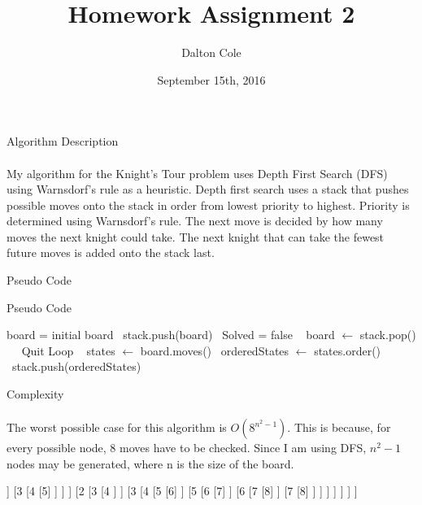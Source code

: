 \documentclass{article}
\title{Homework Assignment 2}
\author{Dalton Cole}
\date{September 15th, 2016}
\begin{document}
\maketitle

\pagebreak

\begin{center}
Algorithm Description
\end{center}

\paragraph{}
My algorithm for the Knight's Tour problem uses Depth First Search (DFS) using Warnsdorf's rule as a heuristic. Depth first search
uses a stack that pushes possible moves onto the stack in order from lowest priority to highest. Priority is determined using
Warnsdorf's rule. The next move is decided by how many moves the next knight could take. The next knight that can take the fewest
future moves is added onto the stack last.

\begin{center}
Pseudo Code
\end{center}

\begin{algorithm}
\caption{Pseudo Code}\label{euclid}
\begin{algorithmic}[1]
\State board = initial board \
\State stack.push(board) \
\State Solved = false \
	\State board $\gets$ stack.pop() \
	 \
		\State Quit Loop \
	\EndIf
	\State states $\gets$ board.moves() \
	\State orderedStates $\gets$ states.order() \
	\State stack.push(orderedStates) \
\EndWhile
\EndProcedure
\end{algorithmic}
\end{algorithm}

\begin{center}
Complexity
\end{center}

\paragraph{}
The worst possible case for this algorithm is $O(8^{n^2-1})$. This is because, for every possible node, 8 moves have to be checked. Since I am using DFS, $n^2-1$ nodes may be generated, where n is the size of the board.


\begin{forest}
  [1
    [2
     [3
       [4]
     ]
     [3
       [4
         [5]
       ]
     ]
    ]
    [2
      [3
        [4
        ]
      ]
      [3
        [4
          [5
            [6]
          ]
          [5
            [6
              [7]
            ]
            [6
              [7
                [8]
              ]
              [7
                [8]
              ]
            ]
          ]
        ]
      ]
    ]
  ]
\end{forest}
\end{document}

